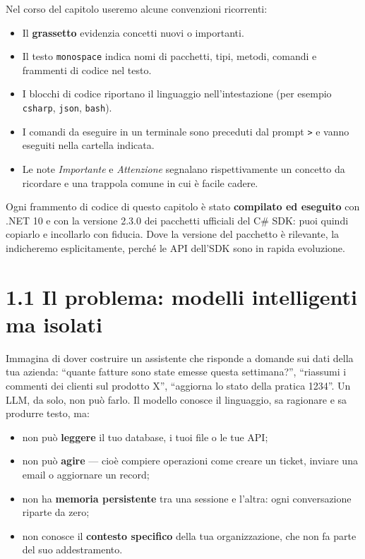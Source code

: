 \documentclass[
  italian,
  10pt,
]{book}
\providecommand{\tightlist}{%
  \setlength{\itemsep}{0pt}\setlength{\parskip}{0pt}}
\begin{document}
Nel corso del capitolo useremo alcune convenzioni ricorrenti:

\begin{itemize}
\tightlist
\item
  Il \textbf{grassetto} evidenzia concetti nuovi o importanti.
\item
  Il testo \texttt{monospace} indica nomi di pacchetti, tipi, metodi,
  comandi e frammenti di codice nel testo.
\item
  I blocchi di codice riportano il linguaggio nell'intestazione (per
  esempio \texttt{csharp}, \texttt{json}, \texttt{bash}).
\item
  I comandi da eseguire in un terminale sono preceduti dal prompt
  \texttt{\textgreater{}} e vanno eseguiti nella cartella indicata.
\item
  Le note \emph{Importante} e \emph{Attenzione} segnalano
  rispettivamente un concetto da ricordare e una trappola comune in cui
  è facile cadere.
\end{itemize}

Ogni frammento di codice di questo capitolo è stato \textbf{compilato ed
eseguito} con .NET 10 e con la versione 2.3.0 dei pacchetti ufficiali
del C\# SDK: puoi quindi copiarlo e incollarlo con fiducia. Dove la
versione del pacchetto è rilevante, la indicheremo esplicitamente,
perché le API dell'SDK sono in rapida evoluzione.

\section{1.1 Il problema: modelli intelligenti ma
isolati}\label{il-problema-modelli-intelligenti-ma-isolati}

Immagina di dover costruire un assistente che risponde a domande sui
dati della tua azienda: ``quante fatture sono state emesse questa
settimana?'', ``riassumi i commenti dei clienti sul prodotto X'',
``aggiorna lo stato della pratica 1234''. Un LLM, da solo, non può
farlo. Il modello conosce il linguaggio, sa ragionare e sa produrre
testo, ma:

\begin{itemize}
\tightlist
\item
  non può \textbf{leggere} il tuo database, i tuoi file o le tue API;
\item
  non può \textbf{agire} --- cioè compiere operazioni come creare un
  ticket, inviare una email o aggiornare un record;
\item
  non ha \textbf{memoria persistente} tra una sessione e l'altra: ogni
  conversazione riparte da zero;
\item
  non conosce il \textbf{contesto specifico} della tua organizzazione,
  che non fa parte del suo addestramento.
\end{itemize}
\end{document}

